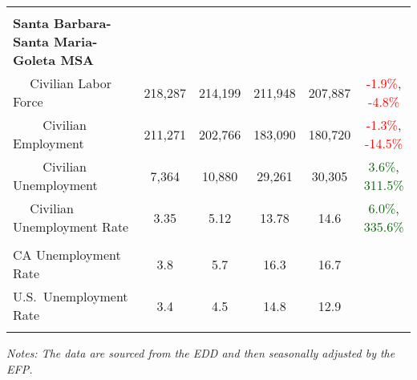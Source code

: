 \documentclass[12pt]{article}
\begin{document}
\begin{landscape}
\begin{table}
\begin{tabular}{|l|c|c|c|c|c|}
&&&&& \\
\textbf{Santa Barbara-Santa Maria-Goleta MSA} &&&&& \\
$\quad$ Civilian Labor Force &218,287 & 214,199 & 211,948 & 207,887 & \textcolor{red}{-1.9\%}, \textcolor{red}{-4.8\%} \\
$\qquad$ \small Civilian Employment &211,271 & 202,766 & 183,090 & 180,720 & \textcolor{red}{-1.3\%}, \textcolor{red}{-14.5\%} \\
$\qquad$ \small Civilian Unemployment &7,364 & 10,880 & 29,261 & 30,305 & \textcolor{darkgreen}{3.6\%}, \textcolor{darkgreen}{311.5\%} \\
$\quad$ Civilian Unemployment Rate &3.35 & 5.12 & 13.78 & 14.6 & \textcolor{darkgreen}{6.0\%}, \textcolor{darkgreen}{335.6\%} \\
&&&&& \\
CA Unemployment Rate & 3.8 & 5.7 & 16.3 & 16.7 & \\
U.S.\ Unemployment Rate & 3.4 & 4.5 & 14.8 & 12.9 & \\
& & & & & \\ \hline \hline
\end{tabular}
\par
\vspace{.5em}
\footnotesize
\textit{Notes: The data are sourced from the EDD and then seasonally adjusted by the EFP.}
\end{table}
\end{landscape}
\end{document}
